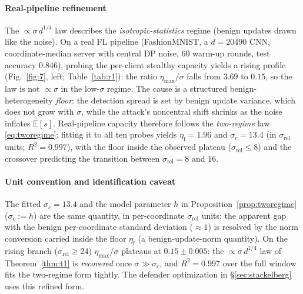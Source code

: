 \documentclass[final,1p,times]{elsarticle}
\begin{document}
\paragraph{Real-pipeline refinement}\label{sec:t1-refine}
The $\propto\sigma\, d^{1/4}$ law describes the
\emph{isotropic-statistics} regime (benign updates drawn like the noise).
On a real FL pipeline (FashionMNIST, a $d{=}20490$ CNN, coordinate-median
server with central DP noise, $60$ warm-up rounds, test accuracy $0.846$),
probing the per-client stealthy capacity yields a rising profile
(Fig.~\ref{fig:7}, left; Table~\ref{tab:r1}): the ratio
$\eta_{\max}/\sigma$ falls from $3.69$ to $0.15$, so the law is not
$\propto\sigma$ in the low-$\sigma$ regime. The cause is a
structured benign-heterogeneity \emph{floor}: the detection spread is set
by benign update variance, which does not grow with $\sigma$, while the
attack's noncentral shift shrinks as the noise inflates
$\mathbb{E}[s]$. Real-pipeline capacity therefore follows the
\emph{two-regime} law \eqref{eq:tworegime}: fitting it to all ten
probes yields $\eta_{\mathrm{f}}=1.96$ and $\sigma_c=13.4$ (in
$\sigma_{\mathrm{rel}}$ units; $R^2=0.997$), with the floor inside the
observed plateau ($\sigma_{\mathrm{rel}}\le 8$) and the crossover
predicting the transition between $\sigma_{\mathrm{rel}}=8$ and $16$.
\paragraph{Unit convention and identification caveat}
The fitted $\sigma_c=13.4$ and the model parameter $h$ in
Proposition~\ref{prop:tworegime} ($\sigma_c:=h$) are the same quantity,
in per-coordinate $\sigma_{\mathrm{rel}}$ units; the apparent gap with
the benign per-coordinate standard deviation ($\approx 1$) is resolved
by the norm conversion carried inside the floor $\eta_{\mathrm{f}}$
(a benign-update-norm quantity). On the rising branch
($\sigma_{\mathrm{rel}}\ge 24$) $\eta_{\max}/\sigma$ plateaus at
$0.15\pm0.005$: the $\propto\sigma\, d^{1/4}$ law of
Theorem~\ref{thm:t1} is \emph{recovered} once $\sigma\gg\sigma_c$, and
$R^2{=}0.997$ over the full window fits the two-regime form
tightly. The defender optimization in \S\ref{sec:stackelberg} uses
this refined form.
\end{document}
